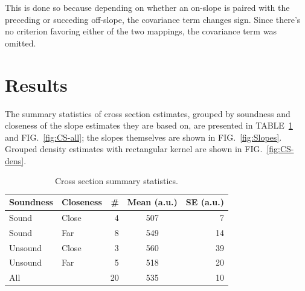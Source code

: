 \documentclass[reprint]{revtex4-1}
\begin{document}
This is done so because depending on whether an on-slope is paired with the preceding or succeding off-slope, the covariance term changes sign. Since there's no criterion favoring either of the two mappings, the covariance term was omitted.

\section{Results}
The summary statistics of cross section estimates, grouped by soundness and closeness of the slope estimates they are based on, are presented in TABLE~\ref{tbl:CS-all} and FIG.~\ref{fig:CS-all}; the slopes themselves are shown in FIG.~\ref{fig:Slopes}. Grouped density estimates with rectangular kernel are shown in FIG.~\ref{fig:CS-dens}.

\begin{table}[t]
\centering
\caption{Cross section summary statistics. \label{tbl:CS-all}}
\begin{tabular}{llrcr}
\hline\hline
Soundness	& Closeness		& \#		& Mean (a.u.)		& SE (a.u.) \\
\hline
Sound		& Close			& 4			& 507				& 7  \\
Sound		& Far			& 8			& 549				& 14 \\
Unsound		& Close			& 3			& 560				& 39 \\
Unsound		& Far			& 5			& 518				& 20 \\
\hline
All			& 				& 20		& 535				& 10 \\
\end{tabular}
\end{table}~
\end{document}
